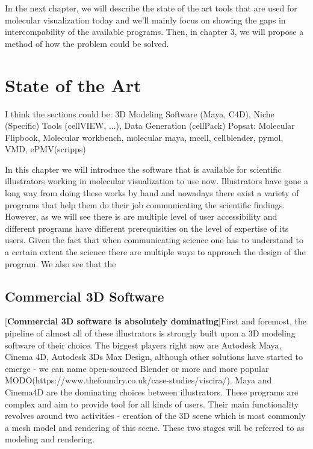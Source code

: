 \documentclass[
  digital, %
  table,   %
  nolof,     %
  nolot,     %
]{fithesis3}
\begin{document}
In the next chapter, we will describe the state of the art tools that are used for molecular visualization today and we'll mainly focus on showing the gaps in intercompability of the available programs. Then, in chapter 3, we will propose a method of how the problem could be solved.

\chapter{State of the Art}
I think the sections could be: 3D Modeling Software (Maya, C4D), Niche (Specific) Tools (cellVIEW, ...), Data Generation (cellPack)
Popsat: Molecular Flipbook, Molecular workbench, molecular maya, mcell, cellblender, pymol, VMD, ePMV(scripps)

In this chapter we will introduce the software that is available for scientific illustrators working in molecular visualization to use now. Illustrators have gone a long way from doing these works by hand and nowadays there exist a variety of programs that help them do their job communicating the scientific findings. However, as we will see there is are multiple level of user accessibility and different programs have different prerequisities on the level of expertise of its users. Given the fact that when communicating science one has to understand to a certain extent the science there are multiple ways to approach the design of the program. We also see that the

\section{Commercial 3D Software}
[\textbf{Commercial 3D software is absolutely dominating}]First and foremost, the pipeline of almost all of these illustrators is strongly built upon a 3D modeling software of their choice. The biggest players right now are Autodesk Maya, Cinema 4D, Autodesk 3Ds Max Design, although other solutions have started to emerge - we can name open-sourced Blender or more and more popular MODO(https://www.thefoundry.co.uk/case-studies/viscira/). Maya and Cinema4D are the dominating choices between illustrators. These programs are complex and aim to provide tool for all kinds of users. Their main functionality revolves around two activities - creation of the 3D scene which is most commonly a mesh model and rendering of this scene. These two stages will be referred to as modeling and rendering.
\end{document}
